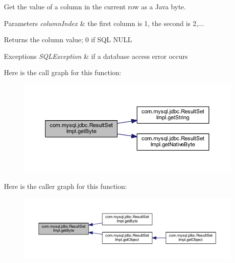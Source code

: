 Get the value of a column in the current row as a Java byte.


\begin{DoxyParams}{Parameters}
{\em column\+Index} & the first column is 1, the second is 2,...\\
\hline
\end{DoxyParams}
\begin{DoxyReturn}{Returns}
the column value; 0 if S\+QL N\+U\+LL
\end{DoxyReturn}

\begin{DoxyExceptions}{Exceptions}
{\em S\+Q\+L\+Exception} & if a database access error occurs \\
\hline
\end{DoxyExceptions}
Here is the call graph for this function\+:
\nopagebreak
\begin{figure}[H]
\begin{center}
\leavevmode
\includegraphics[width=350pt]{classcom_1_1mysql_1_1jdbc_1_1_result_set_impl_aa8f3b2bde47957027d8741c7ec1bd488_cgraph}
\end{center}
\end{figure}
Here is the caller graph for this function\+:
\nopagebreak
\begin{figure}[H]
\begin{center}
\leavevmode
\includegraphics[width=350pt]{classcom_1_1mysql_1_1jdbc_1_1_result_set_impl_aa8f3b2bde47957027d8741c7ec1bd488_icgraph}
\end{center}
\end{figure}
\mbox{\label{classcom_1_1mysql_1_1jdbc_1_1_result_set_impl_a026c2532a7205235f2f6bc3537f6add6}} 
